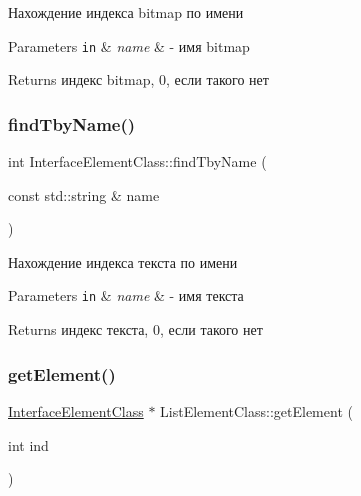 Нахождение индекса bitmap по имени 


\begin{DoxyParams}[1]{Parameters}
\mbox{\tt in}  & {\em name} & -\/ имя bitmap \\
\hline
\end{DoxyParams}
\begin{DoxyReturn}{Returns}
индекс bitmap, 0, если такого нет 
\end{DoxyReturn}
\mbox{\label{class_interface_element_class_a2d7805e3c6f80068b76618e3ad43f31f}} 
\subsubsection{\texorpdfstring{find\+Tby\+Name()}{findTbyName()}}
{\footnotesize\ttfamily int Interface\+Element\+Class\+::find\+Tby\+Name (\begin{DoxyParamCaption}\item[{const std\+::string \&}]{name }\end{DoxyParamCaption})\hspace{0.3cm}{\ttfamily [inherited]}}



Нахождение индекса текста по имени 


\begin{DoxyParams}[1]{Parameters}
\mbox{\tt in}  & {\em name} & -\/ имя текста \\
\hline
\end{DoxyParams}
\begin{DoxyReturn}{Returns}
индекс текста, 0, если такого нет 
\end{DoxyReturn}
\mbox{\label{class_list_element_class_aaec0cdf8ec3c6a2e9e92cbc33d366b65}} 
\subsubsection{\texorpdfstring{get\+Element()}{getElement()}}
{\footnotesize\ttfamily \hyperlink{class_interface_element_class}{Interface\+Element\+Class} $\ast$ List\+Element\+Class\+::get\+Element (\begin{DoxyParamCaption}\item[{int}]{ind }\end{DoxyParamCaption})\hspace{0.3cm}{\ttfamily [virtual]}}



